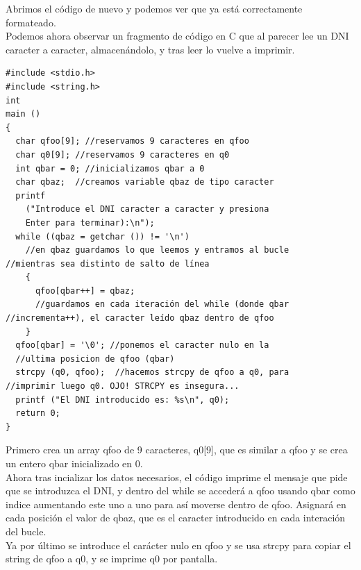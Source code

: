 \newpage 
\noindent Abrimos el código de nuevo y podemos ver que ya está correctamente formateado.
\\
\noindent Podemos ahora observar un fragmento de código en C que al parecer lee un DNI caracter a caracter, almacenándolo, y tras leer lo vuelve a imprimir.
\begin{verbatim}
#include <stdio.h>
#include <string.h>
int
main ()
{
  char qfoo[9]; //reservamos 9 caracteres en qfoo
  char q0[9]; //reservamos 9 caracteres en q0
  int qbar = 0; //inicializamos qbar a 0
  char qbaz;  //creamos variable qbaz de tipo caracter
  printf
    ("Introduce el DNI caracter a caracter y presiona 
    Enter para terminar):\n");
  while ((qbaz = getchar ()) != '\n') 
    //en qbaz guardamos lo que leemos y entramos al bucle            //mientras sea distinto de salto de línea
    {
      qfoo[qbar++] = qbaz; 
      //guardamos en cada iteración del while (donde qbar              //incrementa++), el caracter leído qbaz dentro de qfoo
    }
  qfoo[qbar] = '\0'; //ponemos el caracter nulo en la 
  //ultima posicion de qfoo (qbar)
  strcpy (q0, qfoo);  //hacemos strcpy de qfoo a q0, para                  //imprimir luego q0. OJO! STRCPY es insegura...
  printf ("El DNI introducido es: %s\n", q0);
  return 0;
}
\end{verbatim}

\noindent Primero crea un array qfoo de 9 caracteres,  q0[9], que es similar a qfoo y se crea un entero qbar inicializado en 0.
\\Ahora tras incializar los datos necesarios, el código imprime el mensaje que pide que se introduzca el DNI, y dentro del while se accederá a qfoo usando qbar como indice aumentando este uno a uno para así moverse dentro de qfoo. Asignará en cada posición el valor de qbaz, que es el caracter introducido en cada interación del bucle.
\\Ya por último se introduce el carácter nulo en qfoo y se usa strcpy para copiar el string de qfoo a q0, y se imprime q0 por pantalla.


\newpage
